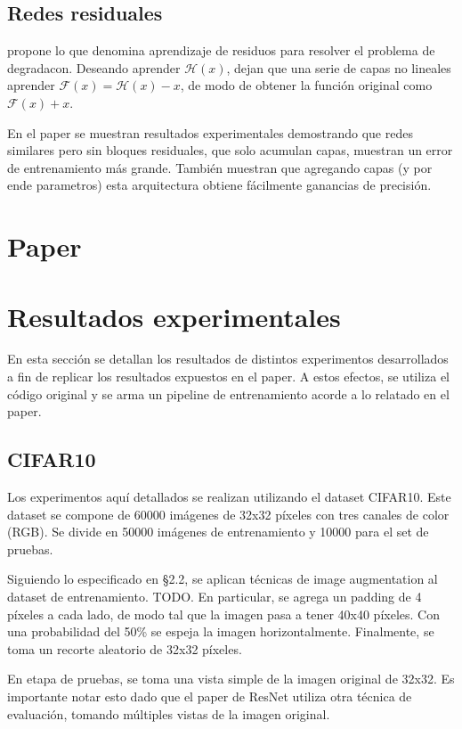 \documentclass[titlepage,a4paper,oneside]{article}
\begin{document}
\subsection{Redes residuales}
\cite{ResNet} propone lo que denomina aprendizaje de residuos para resolver el problema de degradacon. Deseando aprender $\mathscr{H}(x)$, dejan que una serie de capas no lineales aprender $\mathscr{F}(x) = \mathscr{H}(x) - x$, de modo de obtener la función original como $\mathscr{F}(x) + x$.

En el paper se muestran resultados experimentales demostrando que redes similares pero sin bloques residuales, que solo acumulan capas, muestran un error de entrenamiento más grande. También muestran que agregando capas (y por ende parametros) esta arquitectura obtiene fácilmente ganancias de precisión.

\section{Paper}

\section{Resultados experimentales}
En esta sección se detallan los resultados de distintos experimentos desarrollados a fin de replicar los resultados expuestos en el paper. A estos efectos, se utiliza el código original y se arma un pipeline de entrenamiento acorde a lo relatado en el paper.

\subsection{CIFAR10}
Los experimentos aquí detallados se realizan utilizando el dataset CIFAR10. Este dataset se compone de 60000 imágenes de 32x32 píxeles con tres canales de color (RGB). Se divide en 50000 imágenes de entrenamiento y 10000 para el set de pruebas.

Siguiendo lo especificado en \S 2.2, se aplican técnicas de image augmentation al dataset de entrenamiento. TODO. En particular, se agrega un padding de 4 píxeles a cada lado, de modo tal que la imagen pasa a tener 40x40 píxeles. Con una probabilidad del 50\% se espeja la imagen horizontalmente. Finalmente, se toma un recorte aleatorio de 32x32 píxeles.

En etapa de pruebas, se toma una vista simple de la imagen original de 32x32. Es importante notar esto dado que el paper de ResNet utiliza otra técnica de evaluación, tomando múltiples vistas de la imagen original.
\end{document}
